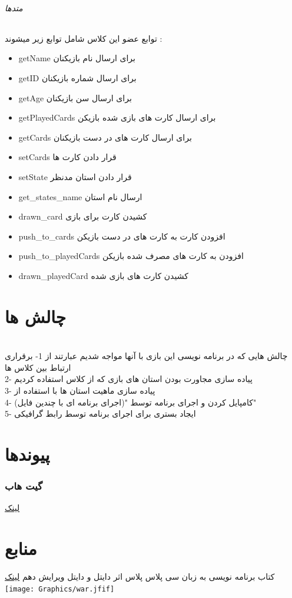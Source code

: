 \documentclass[pdf,titlepage,a4paper]{report}
\begin{document}
	\paragraph{متدها}
	توابع عضو این کلاس شامل توابع زیر میشوند :
	
	\begin{latin}
		\begin{itemize}
			\item getName برای ارسال نام بازیکنان
			\item getID برای ارسال شماره بازیکنان
			\item getAge  برای ارسال سن بازیکنان
			\item getPlayedCards برای ارسال کارت های بازی شده بازیکن
			\item getCards برای ارسال کارت های در دست بازیکنان
			\item setCards قرار دادن کارت ها
			\item setState قرار دادن استان مدنظر
			\item get\_states\_name ارسال نام استان
			\item drawn\_card کشیدن کارت برای بازی 
			\item push\_to\_cards افزودن کارت به کارت های در دست بازیکن
			\item push\_to\_playedCards افزودن به کارت های مصرف شده بازیکن
			\item drawn\_playedCard کشیدن کارت های بازی شده
		\end{itemize}
	\end{latin}
	
	\newpage
	
	
	
	\part{چالش ها}
	\\چالش هایی که در برنامه نویسی این بازی با آنها مواجه شدیم عبارتند از 
	1- برقراری ارتباط بین کلاس ها \\
	2- پیاده سازی مجاورت بودن استان های بازی که از کلاس   استفاده کردیم \\
	3- پیاده سازی ماهیت استان ها با استفاده از  \\
	4- کامپایل کردن و اجرای برنامه توسط  "(اجرای برنامه ای با چندین فایل)"\\
    5- ایجاد بستری برای اجرای برنامه توسط رابط گرافیکی \\

	\newpage
		
	\part{پیوندها}
	\section{گیت هاب}
	\href{https://github.com/Matin0789/Condottiere-.git}{لینک}

	\newpage
	
	
	
	\part{منابع}
	کتاب برنامه نویسی به زبان سی پلاس پلاس اثر دایتل و دایتل ویرایش دهم
	\href{https://www.geeksforgeeks.org/c-plus-plus/}{لینک}
	\newpage
	\texttt{[image: Graphics/war.jfif]}
\end{document}
